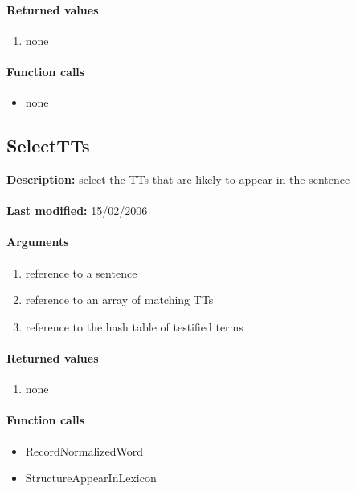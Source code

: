\paragraph{Returned values}
\begin{enumerate}
\item none
\end{enumerate}

\paragraph{Function calls}
\begin{itemize}
\item none
\end{itemize}

\subsection{SelectTTs}
\textbf{Description:} select the TTs that are likely to appear in the sentence\\
\\\textbf{Last modified:} 15/02/2006

\paragraph{Arguments}
\begin{enumerate}
\item reference to a sentence
\item reference to an array of matching TTs
\item reference to the hash table of testified terms
\end{enumerate}

\paragraph{Returned values}
\begin{enumerate}
\item none
\end{enumerate}

\paragraph{Function calls}
\begin{itemize}
\item RecordNormalizedWord
\item StructureAppearInLexicon
\end{itemize}

